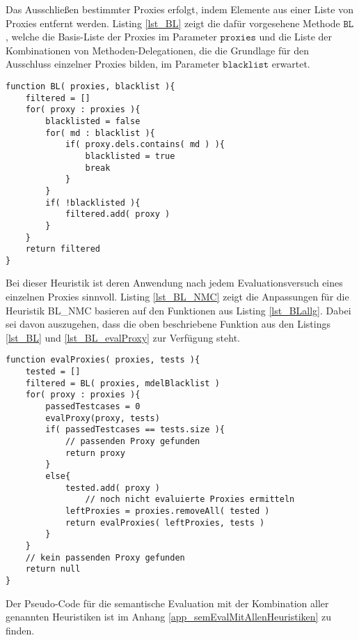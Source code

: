 \noindent
Das Ausschließen bestimmter Proxies erfolgt, indem Elemente aus einer Liste von Proxies entfernt werden. Listing \ref{lst_BL} zeigt die dafür vorgesehene Methode $\texttt{BL}$, welche die Basis-Liste der Proxies im Parameter $\texttt{proxies}$ und die Liste der Kombinationen von Methoden-Delegationen, die die Grundlage für den Ausschluss einzelner Proxies bilden, im Parameter $\texttt{blacklist}$ erwartet.
\begin{lstlisting}[style = pseudo, label = lst_BL, caption=Blacklist-Methode für Heuristil BL\_NMC, captionpos = b]
function BL( proxies, blacklist ){
	filtered = []	
	for( proxy : proxies ){
		blacklisted = false
		for( md : blacklist ){
			if( proxy.dels.contains( md ) ){
				blacklisted = true
				break
			}	
		}
		if( !blacklisted ){
			filtered.add( proxy )
		}
	}
	return filtered
}

\end{lstlisting}
\noindent
Bei dieser Heuristik ist deren Anwendung nach jedem Evaluationsversuch eines einzelnen Proxies sinnvoll. Listing \ref{lst_BL_NMC} zeigt die Anpassungen für die Heuristik BL\_NMC basieren auf den Funktionen aus Listing \ref{lst_BLallg}. Dabei sei davon auszugehen, dass die oben beschriebene Funktion aus den Listings \ref{lst_BL} und \ref{lst_BL_evalProxy} zur Verfügung steht.
\begin{lstlisting}[style = pseudo, caption=Evaluation mehrere Proxies mit BL\_MNC, captionpos=b, label = lst_BL_NMC]
function evalProxies( proxies, tests ){
	tested = []
	filtered = BL( proxies, mdelBlacklist )
	for( proxy : proxies ){
		passedTestcases = 0
		evalProxy(proxy, tests)
		if( passedTestcases == tests.size ){
			// passenden Proxy gefunden
			return proxy
		}
		else{
			tested.add( proxy )
				// noch nicht evaluierte Proxies ermitteln
			leftProxies = proxies.removeAll( tested )	
			return evalProxies( leftProxies, tests )
		}
	}
	// kein passenden Proxy gefunden
	return null
}
\end{lstlisting}
\noindent
Der Pseudo-Code für die semantische Evaluation mit der Kombination aller genannten Heuristiken ist im Anhang \ref{app_semEvalMitAllenHeuristiken} zu finden.


